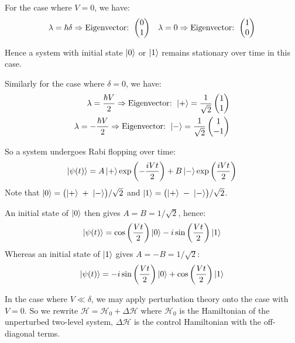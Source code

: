 \begin{parts}
	For the case where $V = 0$, we have:
	\begin{align*}
		\lambda = \hbar\delta \Rightarrow \textnormal{Eigenvector: }
		\begin{pmatrix}
			0 \\ 1
		\end{pmatrix}
		&& \lambda = 0 \Rightarrow \textnormal{Eigenvector: }
		\begin{pmatrix}
			1 \\ 0
		\end{pmatrix}
	\end{align*}
	
	Hence a system with initial state $\ket{0}$ or $\ket{1}$ remains stationary over time in this case.
	
	Similarly for the case where $\delta = 0$, we have:
	\begin{align*}
		\lambda = \frac{\hbar V}{2} \Rightarrow \textnormal{Eigenvector: }
		\ket{+} = \frac{1}{\sqrt{2}}
		\begin{pmatrix}
			1 \\ 1
		\end{pmatrix} \\
		\lambda = -\frac{\hbar V}{2} \Rightarrow \textnormal{Eigenvector: }
		\ket{-} = \frac{1}{\sqrt{2}}
		\begin{pmatrix}
			1 \\ -1
		\end{pmatrix}
	\end{align*}
	
	So a system undergoes Rabi flopping over time:
	\begin{equation*}
		\ket{\psi(t)} = A \ket{+} \exp\left(-\frac{iVt}{2}\right) + B \ket{-} \exp\left(\frac{iVt}{2}\right)
	\end{equation*}
	Note that $\ket{0} = \bigl(\ket{+} \;+\; \ket{-}\bigr) / \sqrt{2}$ and $\ket{1} = \bigl(\ket{+} \;-\; \ket{-}\bigr) / \sqrt{2}$.
	
	An initial state of $\ket{0}$ then gives $A = B = 1/\sqrt{2}$, hence:
	\begin{equation*}
		\ket{\psi(t)} = \cos\left(\frac{Vt}{2}\right) \ket{0} -i\sin\left(\frac{Vt}{2}\right) \ket{1}
	\end{equation*}
	Whereas an initial state of $\ket{1}$ gives $A = -B = 1/\sqrt{2}$:
	\begin{equation*}
		\ket{\psi(t)} = -i\sin\left(\frac{Vt}{2}\right) \ket{0} + \cos\left(\frac{Vt}{2}\right) \ket{1}
	\end{equation*}
	
	In the case where $V \ll \delta$, we may apply perturbation theory onto the case with $V = 0$.
	So we rewrite $\mathcal{H} = \mathcal{H}_0 + \Delta\mathcal{H}$ where $\mathcal{H}_0$ is the Hamiltonian of the unperturbed two-level system, $\Delta\mathcal{H}$ is the control Hamiltonian with the off-diagonal terms.
	

\end{parts}
